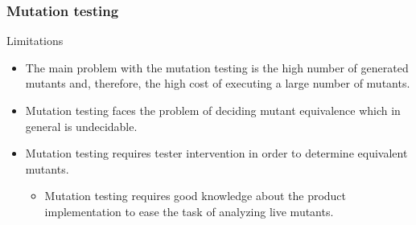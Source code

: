 \begin{frame}[hasprev=false,hasnext=false]
\frametitle{Mutation testing}

\begin{block:fact}{Limitations}
\begin{itemize}
	\item The main problem with the mutation testing is the high number of
	generated mutants and, therefore, the high cost of executing a large number
	of mutants.

	\item Mutation testing faces the problem of deciding mutant equivalence
	which in general is undecidable.

	\item Mutation testing requires tester intervention in order to determine
	equivalent mutants.
	\begin{itemize}
		\item Mutation testing requires good knowledge about the product
		implementation to ease the task of analyzing live mutants.
	\end{itemize}
\end{itemize}
\end{block:fact}
\end{frame}